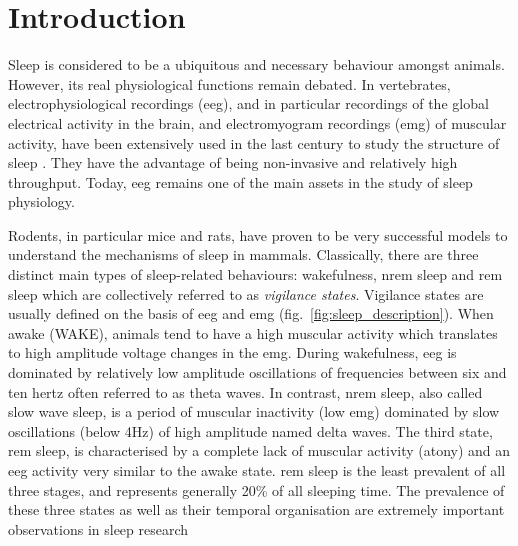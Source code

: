 \section{Introduction} \label{intro}

Sleep is considered to be a ubiquitous and necessary behaviour amongst
animals\cite{siegel_all_2008,cirelli_is_2008}.
However, its real physiological functions remain debated.
In vertebrates, electrophysiological recordings (\gls{eeg}), and in particular recordings of the global electrical activity in the brain,
and electromyogram recordings (\gls{emg}) of muscular activity,
have been extensively used in the last
century to study the structure of sleep \cite{loomis_distribution_1938,aserinsky_regularly_1953}.
They have the advantage of being non-invasive and relatively high throughput.
Today, \gls{eeg} remains one of the main assets in the study of sleep physiology.

Rodents, in particular mice and rats, have proven to be very successful models to
understand the mechanisms of sleep in mammals\cite{toth_animal_2013}.
Classically, there are three distinct main types of sleep-related behaviours: wakefulness, \gls{nrem} sleep and \gls{rem} 
sleep which are collectively referred to as \emph{vigilance states}.
Vigilance states are usually defined on the basis of \gls{eeg} and \gls{emg} (fig.~\ref{fig:sleep_description}).
When awake (WAKE), animals tend to have a high muscular activity which translates to high amplitude voltage changes in the \gls{emg}\cite{crisler_sleep-stage_2008}.
During wakefulness, \gls{eeg} is dominated by relatively low amplitude oscillations of frequencies
between six and ten hertz often referred to as theta waves. 
In contrast, \gls{nrem} sleep, also called slow wave sleep, is a period of muscular inactivity (low \gls{emg})
dominated by slow oscillations (below 4Hz) of high amplitude named delta waves.
\cite{vyazovskiy_nrem_2014}
The third state, \gls{rem} sleep, is characterised by a complete lack of muscular activity (atony) and an \gls{eeg} activity very similar to the awake state.
\gls{rem} sleep is the least prevalent of all three stages, and represents generally  20\% of all sleeping time.
The prevalence of these three states as well as their temporal organisation are extremely important observations in sleep research
\cite{mieda_orexin_2004,pang_unexpected_2009}




